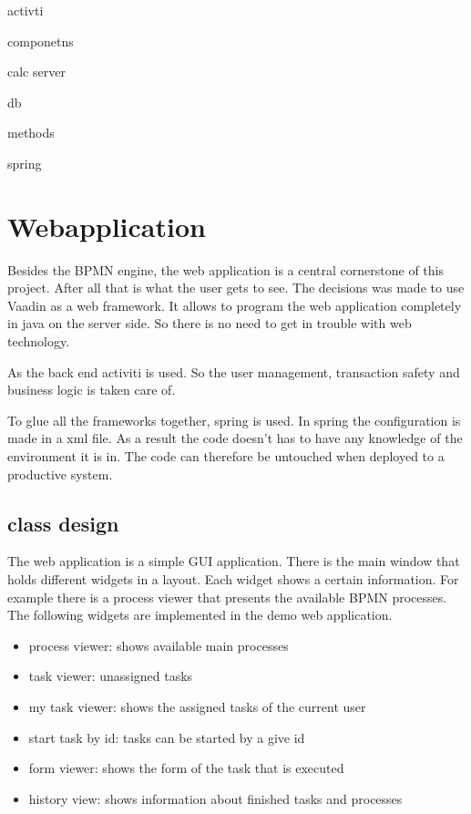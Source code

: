 \documentclass[paper=a4,twoside=false,BCOR=0mm,DIV=calc,fontsize=12pt]{scrartcl}
\begin{document}
activti 



componetns

calc server

db

methods

spring




\section{Webapplication}
Besides the BPMN engine, the web application is a central cornerstone of this project. After all that is what the user gets to see.
The decisions was made to use Vaadin as a web framework. It allows to program the web application completely in java on the server side. So there is
no need to get in trouble with web technology.

As the back end activiti is used. So the user management, transaction safety and business logic is taken care of.

To glue all the frameworks together, spring is used. In spring the configuration is made in a xml file. As a result the code doesn't has to have any 
knowledge of the environment it is in. The code can therefore be untouched when deployed to a productive system.


\subsection{class design}
The web application is a simple GUI application. There is the main window that holds different widgets in a layout. Each widget shows a certain
information. For example there is a process viewer that presents the available BPMN processes. 
The following widgets are implemented in the demo web application.

\begin{itemize}
 \item process viewer: shows available main processes
 \item task viewer: unassigned tasks
 \item my task viewer: shows the assigned tasks of the current user
 \item start task by id: tasks can be started by a give id
 \item form viewer: shows the form of the task that is executed
 \item history view: shows information about finished tasks and processes
\end{itemize}
\end{document}
